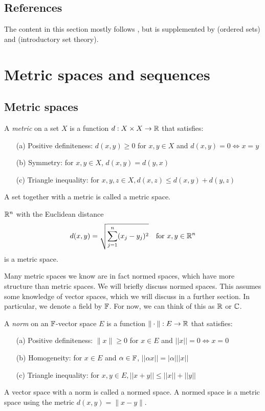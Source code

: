 \documentclass{article}
\begin{document}

\subsection{References}
The content in this section mostly follows \cite{tastetopology}, but is supplemented by \cite{marcoux2019} (ordered sets) and \cite{piotr} (introductory set theory).

\section{Metric spaces and sequences}

\subsection{Metric spaces}
\begin{definition}
A \emph{metric} on a set $X$ is a function $d:X \times X \to {\mathbb{R}}$ that satisfies:
\begin{enumerate}
    \item[(a)] Positive definiteness: $d(x,y) \geq 0$ for $x,y \in X$ and $d(x,y) = 0 \Leftrightarrow x = y$
    \item[(b)] Symmetry: for $x,y \in X$, $d(x,y)= d(y,x)$
    \item[(c)] Triangle inequality: for $x,y,z \in X, d(x,z) \leq d(x,y) + d(y,z)$
\end{enumerate}
A set together with a metric is called a metric space.
\end{definition}

\begin{example}
${\mathbb{R}}^n$ with the Euclidean distance 
\begin{equation*}
    d(x,y) = \sqrt{\sum_{j=1}^n (x_j - y_j)^2} \quad \text{for } x,y \in {\mathbb{R}}^n
\end{equation*}
is a metric space.
\end{example}

Many metric spaces we know are in fact normed spaces, which have more structure than metric spaces. We will briefly discuss normed spaces. This assumes some knowledge of vector spaces, which we will discuss in a further section. In particular, we denote a field by ${\mathbb{F}}$. For now, we can think of this as ${\mathbb{R}}$ or ${\mathbb{C}}$.

\begin{definition}
A \emph{norm} on an ${\mathbb{F}}$-vector space $E$ is a function $\|\cdot\|:E \to {\mathbb{R}}$ that satisfies:
\begin{enumerate}
    \item[(a)] Positive definiteness: $\|x\| \geq 0$ for $x \in E$ and $||x|| = 0 \Leftrightarrow x = 0$
    \item[(b)] Homogeneity: for $x \in E$ and $\alpha \in {\mathbb{F}}$, $||\alpha x || = |\alpha| ||x||$
    \item[(c)] Triangle inequality: for $x,y \in E, ||x+y|| \leq ||x|| + ||y||$
\end{enumerate}
A vector space with a norm is called a normed space. A normed space is a metric space using the metric $d(x,y) = \| x-y \|$.
\end{definition}
\end{document}
